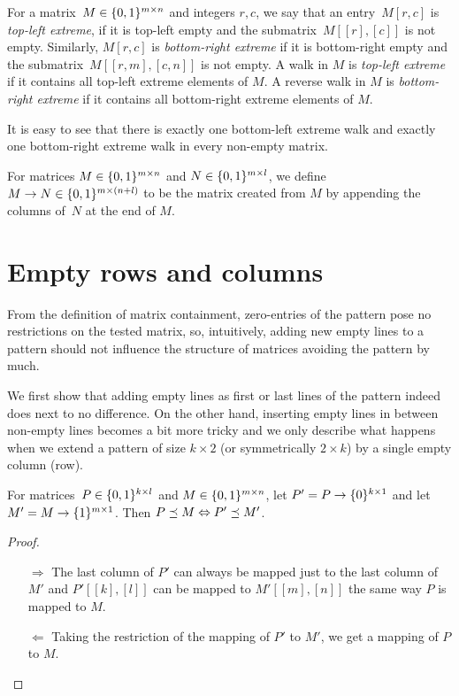 \begin{defn}
For a matrix~$M\in\{0,1\}^{m\times n}$ and integers $r,c$, we say that an entry~$M[r,c]$ is \emph{top-left extreme}, if it is top-left empty and the submatrix~$M[[r],[c]]$ is not empty. Similarly, $M[r,c]$ is \emph{bottom-right extreme} if it is bottom-right empty and the submatrix~$M[[r,m],[c,n]]$ is not empty. A walk in $M$ is \emph{top-left extreme} if it contains all top-left extreme elements of $M$. A reverse walk in $M$ is \emph{bottom-right extreme} if it contains all bottom-right extreme elements of $M$.
\end{defn}

It is easy to see that there is exactly one bottom-left extreme walk and exactly one bottom-right extreme walk in every non-empty matrix.

\begin{defn}
For matrices $M\in\{0,1\}^{m\times n}$ and $N\in\{0,1\}^{m\times l}$, we define $M\rightarrow N\in\{0,1\}^{m\times(n+l)}$ to be the matrix created from $M$ by appending the columns of~$N$ at the end of $M$.
\end{defn}

\section{Empty rows and columns}
\label{sec:empty}
From the definition of matrix containment, zero-entries of the pattern pose no restrictions on the tested matrix, so, intuitively, adding new empty lines to a pattern should not influence the structure of matrices avoiding the pattern by much.

We first show that adding empty lines as first or last lines of the pattern indeed does next to no difference. On the other hand, inserting empty lines in between non-empty lines becomes a bit more tricky and we only describe what happens when we extend a pattern of size $k\times2$ (or symmetrically $2\times k$) by a single empty column (row).

\begin{obs}
\label{obs:emptyrows}
For matrices~$P\in\{0,1\}^{k\times l}$ and $M\in\{0,1\}^{m\times n}$, let $P'=P\rightarrow\{0\}^{k\times1}$ and let $M'=M\rightarrow\{1\}^{m\times1}$. Then $P\preceq M\Leftrightarrow P'\preceq M'$.
\end{obs}
\begin{proof}
\begin{itemize}
	\item[$\Rightarrow$] The last column of $P'$ can always be mapped just to the last column of $M'$ and $P'[[k],[l]]$ can be mapped to $M'[[m],[n]]$ the same way $P$ is mapped to $M$.
	\item[$\Leftarrow$] Taking the restriction of the mapping of $P'$ to $M'$, we get a mapping of $P$ to $M$. \qedhere
\end{itemize}
\end{proof}

